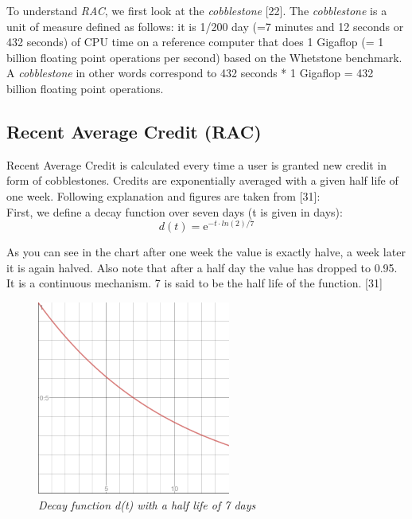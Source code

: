 To understand \textit{RAC}, we first look at the \textit{cobblestone} [22]. The \textit{cobblestone} is a unit of measure defined as follows: it is 1/200 day (=7 minutes and 12 seconds or 432 seconds) of CPU time on a reference computer that does 1 Gigaflop (= 1 billion floating point operations per second) based on the Whetstone benchmark. A \textit{cobblestone} in other words correspond to 432 seconds * 1 Gigaflop = 432 billion floating point operations.\\


\subsection{Recent Average Credit (RAC)}

Recent Average Credit is calculated every time a user is granted new credit in form of cobblestones. Credits are exponentially averaged with a given half life of one week. Following explanation and figures are taken from [31]:\\

First, we define a decay function over seven days (t is given in days):\\

\begin{equation}
d(t) =  \mathrm{e}^{-t \cdot  ln(2) / 7}  
\end{equation}

As you can see in the chart after one week the value is exactly halve, a week later it is again halved. Also note that after a half day the value has dropped to 0.95. It is a continuous mechanism. 7 is said to be the half life of the function. [31]\\


\begin{figure}
\centering
\includegraphics{figures/halflife}
\medskip
\caption{\textit{Decay function d(t) with a half life of 7 days }}
\small
\end{figure}


